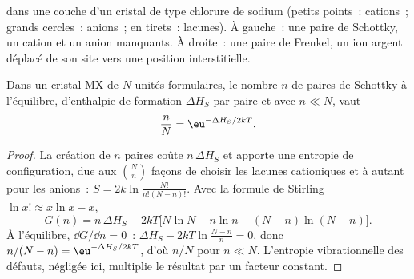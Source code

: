 \begin{omfigure}

{\small {} dans une couche d'un cristal de type chlorure de
sodium (petits points~: cations~; grands cercles~: anions~; en tirets~:
lacunes). À gauche~: une paire de Schottky, un cation et un anion
manquants. À droite~: une paire de Frenkel, un ion argent déplacé de son
site vers une position interstitielle.}
\end{omfigure}

\begin{theorem}\label{thm:b3:solid-state:schottky}
Dans un cristal MX de $N$ unités formulaires, le nombre $n$ de paires de
Schottky à l'équilibre, d'enthalpie de formation $\Delta H_S$ par paire et avec $n \ll N$, vaut
\[
  \frac{n}{N} = \eu^{-\Delta H_S/2kT}.
\]
\end{theorem}

\begin{proof}
La création de $n$ paires coûte $n\,\Delta H_S$ et apporte une entropie de configuration, due aux
$\binom{N}{n}$ façons de choisir les lacunes cationiques et à autant pour les anions~:
$S = 2k\ln\frac{N!}{n!(N - n)!}$. Avec la formule de Stirling $\ln x! \approx x\ln x - x$,
\[
  G(n) = n\,\Delta H_S - 2kT\bigl[N\ln N - n\ln n - (N - n)\ln(N - n)\bigr].
\]
À l'équilibre, $\dd G/\dd n = 0$~: $\Delta H_S - 2kT\ln\frac{N - n}{n} = 0$, donc $n/(N - n) = \eu^{-\Delta H_S/2kT}$, d'où $n/N$ pour
$n \ll N$. L'entropie vibrationnelle des défauts, négligée ici, multiplie le
résultat par un facteur constant.
\end{proof}

